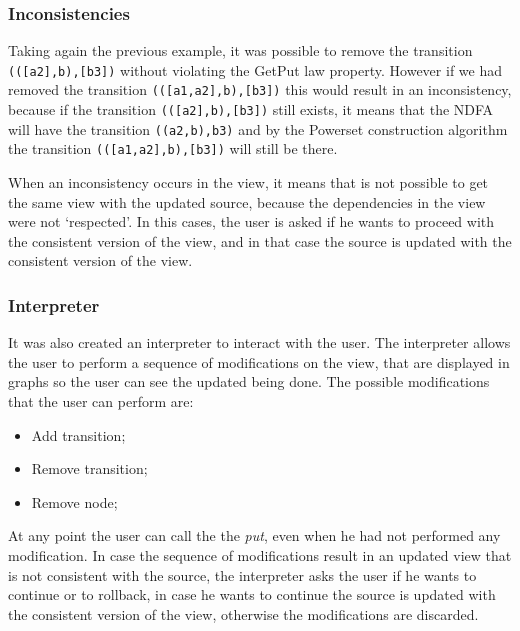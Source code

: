 \subsubsection{Inconsistencies}
Taking again the previous example, it was possible to remove the transition \texttt{(([a2],b),[b3])} without violating the GetPut law property. However if we had removed the transition \texttt{(([a1,a2],b),[b3])} this would result in an inconsistency, because if the transition \texttt{(([a2],b),[b3])} still exists, it means that the NDFA will have the transition \texttt{((a2,b),b3)} and by the Powerset construction algorithm the transition \texttt{(([a1,a2],b),[b3])} will still be there.

When an inconsistency occurs in the view, it means that is not possible to get the same view with the updated source, because the dependencies in the view were not `respected'. In this cases, the user is asked if he wants to proceed with the consistent version of the view, and in that case the source is updated with the consistent version of the view.


\subsubsection{Interpreter}
It was also created an interpreter to interact with the user. The interpreter allows the user to perform a sequence of modifications on the view, that are displayed in graphs so the user can see the updated being done.
The possible modifications that the user can perform are:

\begin{itemize}
    \item Add transition;
    \item Remove transition;
    \item Remove node;
\end{itemize}

At any point the user can call the the \textit{put}, even when he had not performed any modification. In case the sequence of modifications result in an updated view that is not consistent with the source, the interpreter asks the user if he wants to continue or to rollback, in case he wants to continue the source is updated with the consistent version of the view, otherwise the modifications are discarded.
